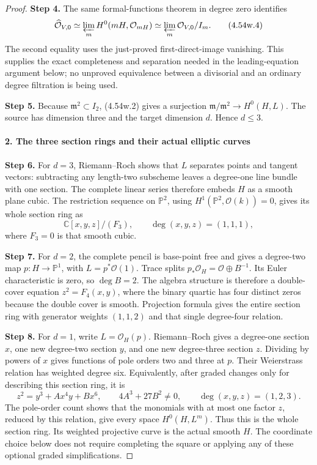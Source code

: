 \begin{proof}
\noindent\textbf{Step 4.} The same formal-functions theorem in degree zero identifies
\[
 \widehat{\mathcal O}_{V,0}
      \simeq\varprojlim_m H^0(mH,\mathcal O_{mH})
      \simeq\varprojlim_m\mathcal O_{V,0}/I_m.          \tag{4.54w.4}
\]
The second equality uses the just-proved first-direct-image
vanishing. This supplies the exact completeness and separation
needed in the leading-equation argument below; no unproved equivalence between a
divisorial and an ordinary degree filtration is being used.

\noindent\textbf{Step 5.} Because \(\mathfrak m^2\subset I_2\), (4.54w.2) gives a
surjection
\(\mathfrak m/\mathfrak m^2\to H^0(H,L)\).
The source has dimension three and the target dimension \(d\).
Hence \(d\le3\).

\paragraph{2. The three section rings and their actual elliptic curves}

\noindent\textbf{Step 6.} For \(d=3\), Riemann--Roch shows that \(L\) separates
points and tangent vectors: subtracting any length-two
subscheme leaves a degree-one line bundle with one section.
The complete linear series therefore embeds \(H\) as a smooth
plane cubic. The restriction sequence on \(\mathbb P^2\),
using \(H^1(\mathbb P^2,\mathcal O(k))=0\), gives its whole
section ring as
\[
 \mathbb C[x,y,z]/(F_3),\qquad \deg(x,y,z)=(1,1,1),
\]
where \(F_3=0\) is that smooth cubic.

\noindent\textbf{Step 7.} For \(d=2\), the complete pencil is base-point free and gives
a degree-two map \(p:H\to\mathbb P^1\), with
\(L=p^*\mathcal O(1)\). Trace splits
\(p_*\mathcal O_H=\mathcal O\oplus B^{-1}\).
Its Euler characteristic is zero, so \(\deg B=2\).
The algebra structure is therefore a double-cover equation
\(z^2=F_4(x,y)\), where the binary quartic has four distinct
zeros because the double cover is smooth. Projection formula
gives the entire section ring with generator weights
\((1,1,2)\) and that single degree-four relation.

\noindent\textbf{Step 8.} For \(d=1\), write \(L=\mathcal O_H(p)\).
Riemann--Roch gives a degree-one section \(x\), one new
degree-two section \(y\), and one new degree-three section
\(z\). Dividing by powers of \(x\) gives functions of pole
orders two and three at \(p\). Their Weierstrass relation
has weighted degree six. Equivalently, after graded changes
only for describing this section ring, it is
\[
 z^2=y^3+A x^4y+B x^6,
 \qquad 4A^3+27B^2\ne0,
 \qquad\deg(x,y,z)=(1,2,3).
\]
The pole-order count shows that the monomials with at most one
factor \(z\), reduced by this relation, give every space
\(H^0(H,L^m)\). Thus this is the whole section ring. Its
weighted projective curve is the actual smooth \(H\).
The coordinate choice below does not require completing the
square or applying any of these optional graded simplifications.


\end{proof}
